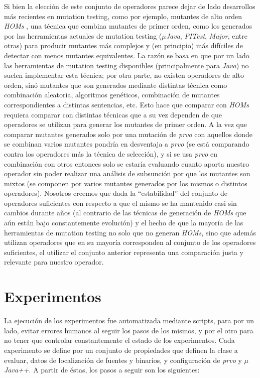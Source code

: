 Si bien la elecci\'on de este conjunto de operadores parece dejar de lado desarrollos m\'as recientes en mutation testing, como por ejemplo, mutantes de alto orden \emph{HOMs} \cite{bibliography.mutation.highorder.JiaH09}, una t\'ecnica que combina mutantes de primer orden, como los generados por las herramientas actuales de mutation testing (\emph{$\mu$Java}, \emph{PITest}, \emph{Major}, entre otras) para producir mutantes m\'as complejos y (en principio) m\'as dif\'iciles de detectar con menos mutantes equivalentes. La raz\'on se basa en que por un lado las herramientas de mutation testing disponibles (principalmente para \emph{Java}) no suelen implementar esta t\'ecnica; por otra parte, no existen operadores de alto orden, sin\'o mutantes que son generados mediante distintas t\'ecnica como combinaci\'on aleatoria, algoritmos gen\'eticos, combinaci\'on de mutantes correspondientes a distintas sentencias, etc. Esto hace que comparar con \emph{HOMs} requiera comparar con distintas t\'ecnicas que a su vez dependen de que operadores se utilizan para generar los mutantes de primer orden. A la vez que comparar mutantes generados solo por una mutaci\'on de \emph{prvo} con aquellos donde se combinan varios mutantes pondr\'ia en desventaja a \emph{prvo} (se est\'a comparando contra los operadores m\'as la t\'ecnica de selecci\'on), y si se usa \emph{prvo} en combinaci\'on con otros entonces solo se estar\'ia evaluando cuanto aporta nuestro operador sin poder realizar una an\'alisis de subsunci\'on por que los mutantes son mixtos (se componen por varios mutantes generados por los mismos o distintos operadores). Nosotros creemos que dada la ``estabilidad'' del conjunto de operadores suficientes con respecto a que el mismo se ha mantenido casi sin cambios durante a\~nos (al contrario de las t\'ecnicas de generaci\'on de \emph{HOMs} que a\'un est\'an bajo constantemente evoluci\'on) y el hecho de que la mayor\'ia de las herramientas de mutation testing no solo que no generan \emph{HOMs}, sino que adem\'as utilizan operadores que en su mayor\'ia corresponden al conjunto de los operadores suficientes, el utilizar el conjunto anterior representa una comparaci\'on justa y relevante para nuestro operador.

\section{Experimentos}
\label{sec:evaluation.steps}

La ejecuci\'on de los experimentos fue automatizada mediante scripts, para por un lado, evitar errores humanos al seguir los pasos de los mismos, y por el otro para no tener que controlar constantemente el estado de los experimentos. Cada experimento se define por un conjunto de propiedades que definen la clase a evaluar, datos de localizaci\'on de fuentes y binarios, y configuraci\'on de \emph{prvo} y \emph{$\mu$Java++}. A partir de \'estas, los pasos a seguir son los siguientes:


